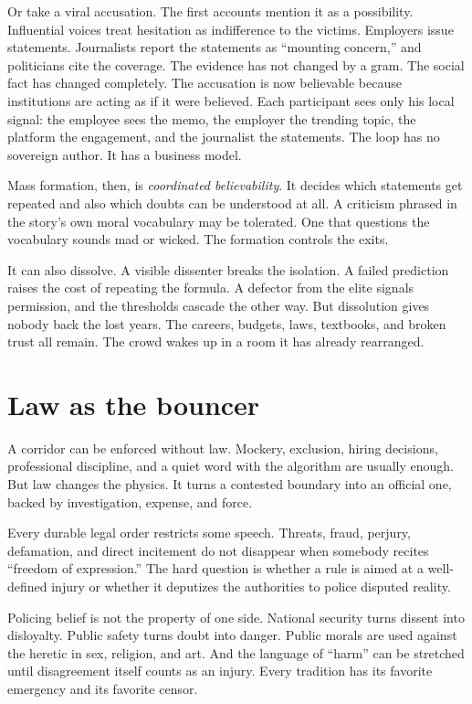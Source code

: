 \documentclass[12pt,a4paper]{book}
\begin{document}
Or take a viral accusation. The first accounts mention it as a possibility. Influential voices treat hesitation as indifference to the victims. Employers issue statements. Journalists report the statements as ``mounting concern,'' and politicians cite the coverage. The evidence has not changed by a gram. The social fact has changed completely. The accusation is now believable because institutions are acting as if it were believed. Each participant sees only his local signal: the employee sees the memo, the employer the trending topic, the platform the engagement, and the journalist the statements. The loop has no sovereign author. It has a business model.

Mass formation, then, is \emph{coordinated believability}. It decides which statements get repeated and also which doubts can be understood at all. A criticism phrased in the story's own moral vocabulary may be tolerated. One that questions the vocabulary sounds mad or wicked. The formation controls the exits.

It can also dissolve. A visible dissenter breaks the isolation. A failed prediction raises the cost of repeating the formula. A defector from the elite signals permission, and the thresholds cascade the other way. But dissolution gives nobody back the lost years. The careers, budgets, laws, textbooks, and broken trust all remain. The crowd wakes up in a room it has already rearranged.

\section{Law as the bouncer}

A corridor can be enforced without law. Mockery, exclusion, hiring decisions, professional discipline, and a quiet word with the algorithm are usually enough. But law changes the physics. It turns a contested boundary into an official one, backed by investigation, expense, and force.

Every durable legal order restricts some speech. Threats, fraud, perjury, defamation, and direct incitement do not disappear when somebody recites ``freedom of expression.'' The hard question is whether a rule is aimed at a well-defined injury or whether it deputizes the authorities to police disputed reality.

Policing belief is not the property of one side. National security turns dissent into disloyalty. Public safety turns doubt into danger. Public morals are used against the heretic in sex, religion, and art. And the language of ``harm'' can be stretched until disagreement itself counts as an injury. Every tradition has its favorite emergency and its favorite censor.
\end{document}
